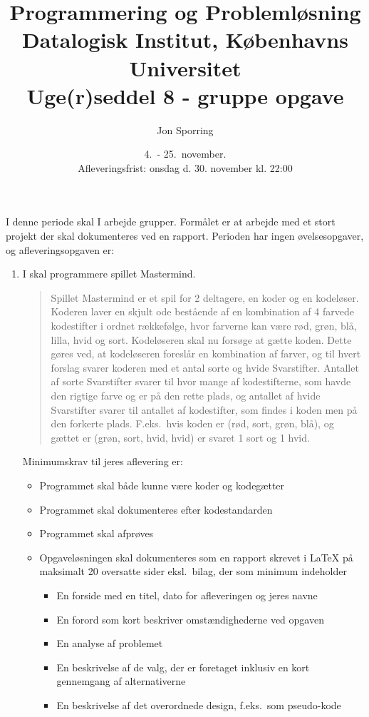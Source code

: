 \documentclass[a4paper,12pt]{article}
\title{Programmering og Problemløsning\\Datalogisk Institut,
  Københavns Universitet\\Uge(r)seddel 8 - gruppe opgave}
\author{Jon Sporring}
\date{4.\ - 25.\ november.\\Afleveringsfrist: onsdag d. 30. november kl. 22:00}
\begin{document}
\maketitle

I denne periode skal I arbejde grupper. Formålet er at arbejde med et stort projekt der skal dokumenteres ved en rapport. Perioden har ingen øvelsesopgaver, og afleveringsopgaven er:
\begin{enumerate}[label=8g.\arabic*,start=0]
\item I skal programmere spillet Mastermind. 
  \begin{quote}
    Spillet Mastermind er et spil for 2 deltagere, en koder og en kodeløser. Koderen laver en skjult ode bestående af en kombination af 4 farvede kodestifter i ordnet rækkefølge, hvor farverne kan være rød, grøn, blå, lilla, hvid og sort. Kodeløseren skal nu forsøge at gætte koden. Dette gøres ved, at kodeløseren foreslår en kombination af farver, og til hvert forslag svarer koderen med et antal sorte og hvide Svarstifter. Antallet af sorte Svarstifter svarer til hvor mange af kodestifterne, som havde den rigtige farve og er på den rette plads, og antallet af hvide Svarstifter svarer til antallet af kodestifter, som findes i koden men på den forkerte plads. F.eks.\ hvis koden er (rød, sort, grøn, blå), og gættet er (grøn, sort, hvid, hvid) er svaret 1 sort og 1 hvid.
  \end{quote}
  Minimumskrav til jeres aflevering er:
  \begin{itemize}
  \item Programmet skal både kunne være koder og kodegætter
  \item Programmet skal dokumenteres efter kodestandarden
  \item Programmet skal afprøves
  \item Opgaveløsningen skal dokumenteres som en rapport skrevet i LaTeX på maksimalt 20 oversatte sider eksl.\ bilag, der som minimum indeholder
    \begin{itemize}
    \item En forside med en titel, dato for afleveringen og jeres navne
    \item En forord som kort beskriver omstændighederne ved opgaven
    \item En analyse af problemet
    \item En beskrivelse af de valg, der er foretaget inklusiv en kort gennemgang af alternativerne
    \item En beskrivelse af det overordnede design, f.eks.\ som pseudo-kode

\end{itemize}
\end{itemize}
\end{enumerate}
\end{document}
